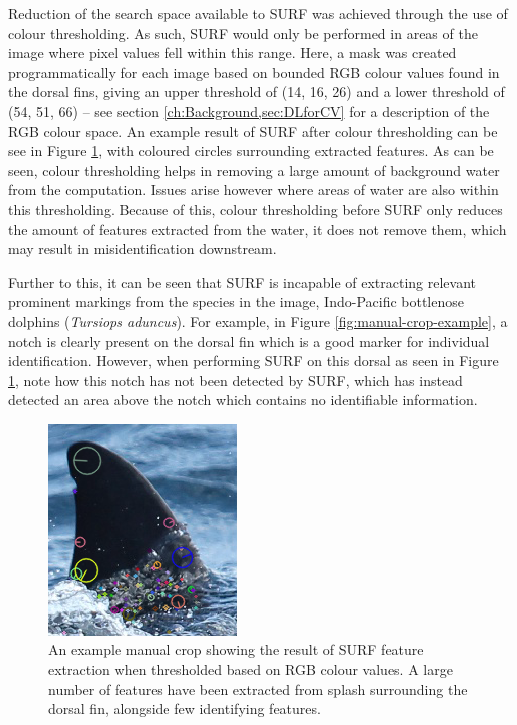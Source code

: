 Reduction of the search space available to SURF was achieved through the use of colour thresholding. As such, SURF would only be performed in areas of the image where pixel values fell within this range. Here, a mask was created programmatically for each image based on bounded RGB colour values found in the dorsal fins, giving an upper threshold of (14, 16, 26) and a lower threshold of (54, 51, 66) -- see section \ref{ch:Background,sec:DLforCV} for a description of the RGB colour space. An example result of SURF after colour thresholding can be see in Figure \ref{fig:manual-crop-surf-colour-thresholding-example}, with coloured circles surrounding extracted features. As can be seen, colour thresholding helps in removing a large amount of background water from the computation. Issues arise however where areas of water are also within this thresholding. Because of this, colour thresholding before SURF only reduces the amount of features extracted from the water, it does not remove them, which may result in misidentification downstream.

Further to this, it can be seen that SURF is incapable of extracting relevant prominent markings from the species in the image, Indo-Pacific bottlenose dolphins (\textit{Tursiops aduncus}). For example, in Figure \ref{fig:manual-crop-example}, a notch is clearly present on the dorsal fin which is a good marker for individual identification. However, when performing SURF on this dorsal as seen in Figure \ref{fig:manual-crop-surf-colour-thresholding-example}, note how this notch has not been detected by SURF, which has instead detected an area above the notch which contains no identifiable information. 

\begin{figure}
	\begin{center}
		\includegraphics[scale=0.6]{Chapter3/figs/manual-crop-surf-colour-thresholding.png}
	\end{center}
	\caption[An example manual crop showing the result of SURF feature extraction when thresholded based on RGB colour values.]{An example manual crop showing the result of SURF feature extraction when thresholded based on RGB colour values. A large number of features have been extracted from splash surrounding the dorsal fin, alongside few identifying features.
	}
	\label{fig:manual-crop-surf-colour-thresholding-example}
\end{figure}

